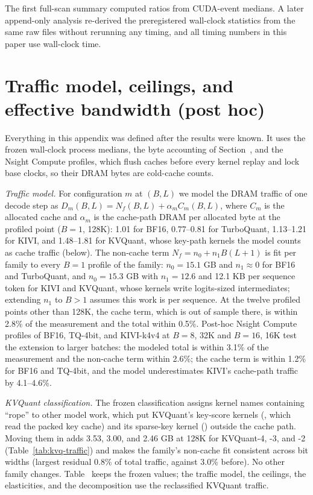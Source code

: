 The first full-scan summary computed ratios from CUDA-event medians.
A later append-only analysis re-derived the preregistered wall-clock statistics from the same raw files without rerunning any timing, and all timing numbers in this paper use wall-clock time.

\section{Traffic model, ceilings, and effective bandwidth (post hoc)}
\label{app:ceilings}

Everything in this appendix was defined after the results were known.
It uses the frozen wall-clock process medians, the byte accounting of Section~, and the Nsight Compute profiles, which flush caches before every kernel replay and lock base clocks, so their DRAM bytes are cold-cache counts.

\textit{Traffic model.}
For configuration $m$ at $(B, L)$ we model the DRAM traffic of one decode step as $D_m(B, L) = N_f(B, L) + \alpha_m C_m(B, L)$, where $C_m$ is the allocated cache and $\alpha_m$ is the cache-path DRAM per allocated byte at the profiled point ($B = 1$, 128K): 1.01 for BF16, 0.77--0.81 for TurboQuant, 1.13--1.21 for KIVI, and 1.48--1.81 for KVQuant, whose key-path kernels the model counts as cache traffic (below).
The non-cache term $N_f = n_0 + n_1 B (L + 1)$ is fit per family to every $B = 1$ profile of the family: $n_0 = 15.1$ GB and $n_1 \approx 0$ for BF16 and TurboQuant, and $n_0 = 15.3$ GB with $n_1 = 12.6$ and 12.1 KB per sequence token for KIVI and KVQuant, whose kernels write logits-sized intermediates; extending $n_1$ to $B > 1$ assumes this work is per sequence.
At the twelve profiled points other than 128K, the cache term, which is out of sample there, is within 2.8\% of the measurement and the total within 0.5\%.
Post-hoc Nsight Compute profiles of BF16, TQ-4bit, and KIVI-k4v4 at $B = 8$, 32K and $B = 16$, 16K test the extension to larger batches: the modeled total is within 3.1\% of the measurement and the non-cache term within 2.6\%; the cache term is within 1.2\% for BF16 and TQ-4bit, and the model underestimates KIVI's cache-path traffic by 4.1--4.6\%.

\textit{KVQuant classification.}
The frozen classification assigns kernel names containing ``rope'' to other model work, which put KVQuant's key-score kernels (, which read the packed key cache) and its sparse-key kernel () outside the cache path.
Moving them in adds 3.53, 3.00, and 2.46 GB at 128K for KVQuant-4, -3, and -2 (Table~\ref{tab:kvq-traffic}) and makes the family's non-cache fit consistent across bit widths (largest residual 0.8\% of total traffic, against 3.0\% before).
No other family changes.
Table~ keeps the frozen values; the traffic model, the ceilings, the elasticities, and the decomposition use the reclassified KVQuant traffic.

